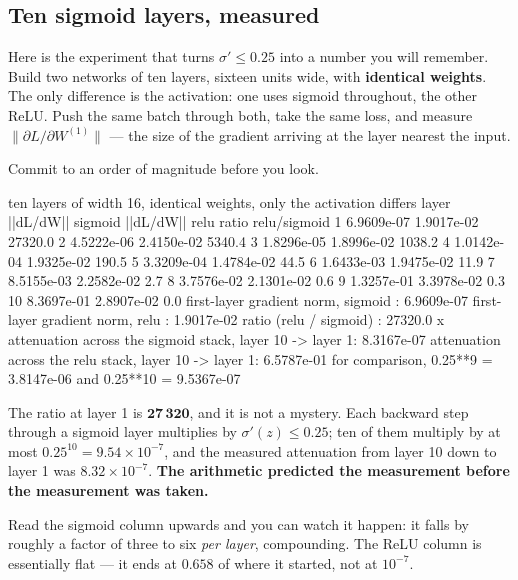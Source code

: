 \documentclass[11pt]{article}
\begin{document}
\subsection{Ten sigmoid layers, measured}
\label{sec:vanish}

Here is the experiment that turns $\sigma' \le 0.25$ into a number you will
remember. Build two networks of ten layers, sixteen units wide, with
\textbf{identical weights}. The only difference is the activation: one uses
sigmoid throughout, the other ReLU. Push the same batch through both, take the
same loss, and measure $\|\partial L / \partial W^{(1)}\|$ --- the size of the
gradient arriving at the layer nearest the input.

Commit to an order of magnitude before you look.

\begin{codeout}
ten layers of width 16, identical weights, only the activation differs
  layer   ||dL/dW|| sigmoid   ||dL/dW|| relu      ratio relu/sigmoid
    1        6.9609e-07         1.9017e-02           27320.0
    2        4.5222e-06         2.4150e-02            5340.4
    3        1.8296e-05         1.8996e-02            1038.2
    4        1.0142e-04         1.9325e-02             190.5
    5        3.3209e-04         1.4784e-02              44.5
    6        1.6433e-03         1.9475e-02              11.9
    7        8.5155e-03         2.2582e-02               2.7
    8        3.7576e-02         2.1301e-02               0.6
    9        1.3257e-01         3.3978e-02               0.3
   10        8.3697e-01         2.8907e-02               0.0
first-layer gradient norm, sigmoid : 6.9609e-07
first-layer gradient norm, relu    : 1.9017e-02
ratio (relu / sigmoid)             : 27320.0 x
attenuation across the sigmoid stack, layer 10 -> layer 1: 8.3167e-07
attenuation across the relu    stack, layer 10 -> layer 1: 6.5787e-01
for comparison, 0.25**9 = 3.8147e-06 and 0.25**10 = 9.5367e-07
\end{codeout}

The ratio at layer 1 is $\mathbf{27\,320}$, and it is not a mystery. Each
backward step through a sigmoid layer multiplies by $\sigma'(z) \le 0.25$; ten
of them multiply by at most $0.25^{10} = 9.54\times10^{-7}$, and the measured
attenuation from layer 10 down to layer 1 was $8.32\times10^{-7}$. \textbf{The
arithmetic predicted the measurement before the measurement was taken.}

Read the sigmoid column upwards and you can watch it happen: it falls by
roughly a factor of three to six \emph{per layer}, compounding. The ReLU
column is essentially flat --- it ends at $0.658$ of where it started, not at
$10^{-7}$.
\end{document}
